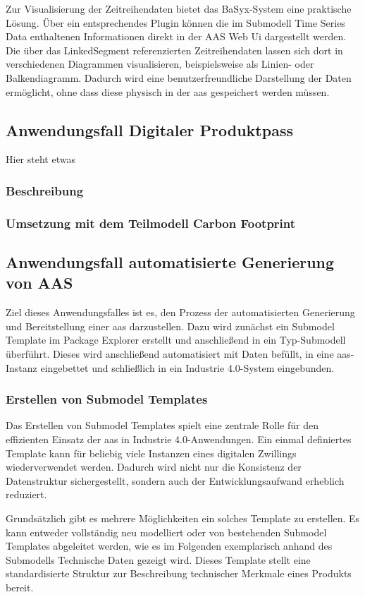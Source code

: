 Zur Visualisierung der Zeitreihendaten bietet das BaSyx-System eine praktische Lösung.
Über ein entsprechendes Plugin können die im Submodell Time Series Data enthaltenen Informationen direkt in der AAS Web Ui dargestellt werden.
Die über das LinkedSegment referenzierten Zeitreihendaten lassen sich dort in verschiedenen Diagrammen visualisieren, beispielsweise als Linien- oder Balkendiagramm.
Dadurch wird eine benutzerfreundliche Darstellung der Daten ermöglicht, ohne dass diese physisch in der \acs{aas} gespeichert werden müssen.

\subsection{Anwendungsfall Digitaler Produktpass}
Hier steht etwas
\subsubsection{Beschreibung}
\subsubsection{Umsetzung mit dem Teilmodell Carbon Footprint}

\newpage
\subsection{Anwendungsfall automatisierte Generierung von AAS}
Ziel dieses Anwendungsfalles ist es, den Prozess der automatisierten Generierung und Bereitstellung einer \acs{aas} darzustellen.
Dazu wird zunächst ein Submodel Template im Package Explorer erstellt und anschließend in ein Typ-Submodell überführt.
Dieses wird anschließend automatisiert mit Daten befüllt, in eine \acs{aas}-Instanz eingebettet und schließlich in ein Industrie 4.0-System eingebunden.

\subsubsection{Erstellen von Submodel Templates}
Das Erstellen von Submodel Templates spielt eine zentrale Rolle für den effizienten Einsatz der \acs{aas} in Industrie 4.0-Anwendungen. 
Ein einmal definiertes Template kann für beliebig viele Instanzen eines digitalen Zwillings wiederverwendet werden. 
Dadurch wird nicht nur die Konsistenz der Datenstruktur sichergestellt, sondern auch der Entwicklungsaufwand erheblich reduziert.

Grundsätzlich gibt es mehrere Möglichkeiten ein solches Template zu erstellen.
Es kann entweder vollständig neu modelliert oder von bestehenden Submodel Templates abgeleitet werden, wie es im Folgenden exemplarisch anhand des Submodells Technische Daten \cite{SpezifikaitonTechnischeDaten} gezeigt wird.
Dieses Template stellt eine standardisierte Struktur zur Beschreibung technischer Merkmale eines Produkts bereit.

